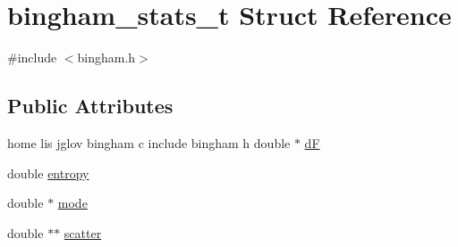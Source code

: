 \hypertarget{structbingham__stats__t}{
\section{bingham\_\-stats\_\-t Struct Reference}
\label{structbingham__stats__t}
}


{\ttfamily \#include $<$bingham.h$>$}

\subsection*{Public Attributes}
\begin{DoxyCompactItemize}
\item 
home lis jglov bingham c include bingham h double $\ast$ \hyperlink{structbingham__stats__t_a775fe067372b415f1e6fad5aa51bb281}{dF}
\item 
double \hyperlink{structbingham__stats__t_afdc3030b09ffb757f81a9825514249bd}{entropy}
\item 
double $\ast$ \hyperlink{structbingham__stats__t_ac1de1886b042fbb1fa558939df04de2d}{mode}
\item 
double $\ast$$\ast$ \hyperlink{structbingham__stats__t_ae9f1d2fe10755050f0b6e14cafd3f598}{scatter}
\end{DoxyCompactItemize}



